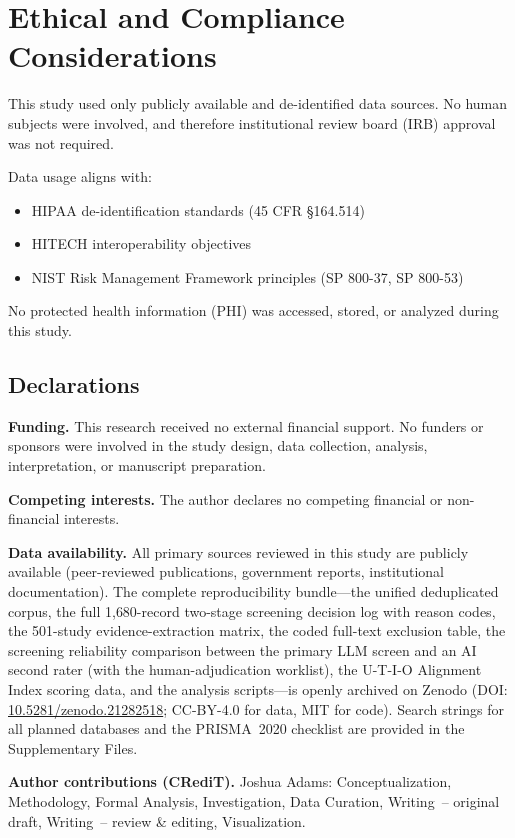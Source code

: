 \section{Ethical and Compliance Considerations}
This study used only publicly available and de-identified data sources. No human subjects were involved, and therefore institutional review board (IRB) approval was not required.

Data usage aligns with:
\begin{itemize}
\item HIPAA de-identification standards (45 CFR \S164.514)~\cite{ecfr164514,hhs2012deidentification}
\item HITECH interoperability objectives
\item NIST Risk Management Framework principles (SP 800-37, SP 800-53)~\cite{nist80037r2,nist80053r5}
\end{itemize}

No protected health information (PHI) was accessed, stored, or analyzed during this study.

\subsection*{Declarations}

\noindent\textbf{Funding.} This research received no external financial support. No funders or sponsors were involved in the study design, data collection, analysis, interpretation, or manuscript preparation.

\noindent\textbf{Competing interests.} The author declares no competing financial or non-financial interests.

\noindent\textbf{Data availability.} All primary sources reviewed in this study are publicly available (peer-reviewed publications, government reports, institutional documentation). The complete reproducibility bundle---the unified deduplicated corpus, the full 1{,}680-record two-stage screening decision log with reason codes, the 501-study evidence-extraction matrix, the coded full-text exclusion table, the screening reliability comparison between the primary LLM screen and an AI second rater (with the human-adjudication worklist), the U-T-I-O Alignment Index scoring data, and the analysis scripts---is openly archived on Zenodo (DOI: \href{https://doi.org/10.5281/zenodo.21282518}{10.5281/zenodo.21282518}; CC-BY-4.0 for data, MIT for code). Search strings for all planned databases and the PRISMA~2020 checklist are provided in the Supplementary Files.

\noindent\textbf{Author contributions (CRediT).} Joshua Adams: Conceptualization, Methodology, Formal Analysis, Investigation, Data Curation, Writing~-- original draft, Writing~-- review \& editing, Visualization.
